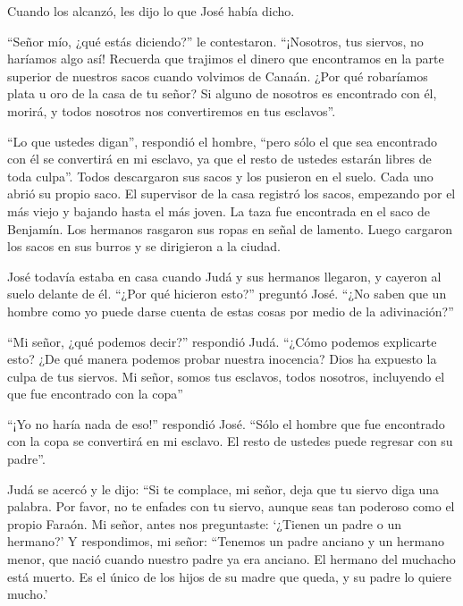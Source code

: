  Cuando los alcanzó, les dijo lo que José había dicho.

 ``Señor mío, ¿qué estás diciendo?'' le contestaron.
``¡Nosotros, tus siervos, no haríamos algo así!  Recuerda
que trajimos el dinero que encontramos en la parte superior de nuestros
sacos cuando volvimos de Canaán. ¿Por qué robaríamos plata u oro de la
casa de tu señor?  Si alguno de nosotros es encontrado con
él, morirá, y todos nosotros nos convertiremos en tus esclavos''.

 ``Lo que ustedes digan'', respondió el hombre, ``pero sólo
el que sea encontrado con él se convertirá en mi esclavo, ya que el
resto de ustedes estarán libres de toda culpa''.  Todos
descargaron sus sacos y los pusieron en el suelo. Cada uno abrió su
propio saco.  El supervisor de la casa registró los sacos,
empezando por el más viejo y bajando hasta el más joven. La taza fue
encontrada en el saco de Benjamín.  Los hermanos rasgaron
sus ropas en señal de lamento. Luego cargaron los sacos en sus burros y
se dirigieron a la ciudad.

 José todavía estaba en casa cuando Judá y sus hermanos
llegaron, y cayeron al suelo delante de él.  ``¿Por qué
hicieron esto?'' preguntó José. ``¿No saben que un hombre como yo puede
darse cuenta de estas cosas por medio de la adivinación?''

 ``Mi señor, ¿qué podemos decir?'' respondió Judá. ``¿Cómo
podemos explicarte esto? ¿De qué manera podemos probar nuestra
inocencia? Dios ha expuesto la culpa de tus siervos. Mi señor, somos tus
esclavos, todos nosotros, incluyendo el que fue encontrado con la copa''

 ``¡Yo no haría nada de eso!'' respondió José. ``Sólo el
hombre que fue encontrado con la copa se convertirá en mi esclavo. El
resto de ustedes puede regresar con su padre''.

 Judá se acercó y le dijo: ``Si te complace, mi señor, deja
que tu siervo diga una palabra. Por favor, no te enfades con tu siervo,
aunque seas tan poderoso como el propio Faraón.  Mi señor,
antes nos preguntaste: `¿Tienen un padre o un hermano?'  Y
respondimos, mi señor: ``Tenemos un padre anciano y un hermano menor,
que nació cuando nuestro padre ya era anciano. El hermano del muchacho
está muerto. Es el único de los hijos de su madre que queda, y su padre
lo quiere mucho.'

